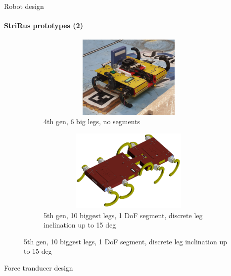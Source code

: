 \documentclass[aspectratio=169]{beamer}
\begin{document}
\begin{frame}[t]{Robot design}
    \framesubtitle{StriRus prototypes (2)}
    \vspace{-0.5cm}
    \begin{figure}[H]
        \begin{subfigure}{0.45\textwidth}
            \centering\includegraphics[height=4cm,width=1\textwidth,keepaspectratio]{strirus_3.JPG}
            \caption*{4th gen, 6 big legs, no segments}
        \end{subfigure}
        \hfill
        \begin{subfigure}{0.45\textwidth}
            \centering\includegraphics[height=4cm,width=1\textwidth,keepaspectratio]{strirus_4.png}
            \caption*{5th gen, 10 biggest legs, 1 DoF segment, discrete leg inclination up to 15 deg}
        \end{subfigure}
        \hfill
    \end{figure}
\end{frame}

\begin{frame}[t]{Force tranducer design}
    \framesubtitle{}
\end{frame}
\end{document}
